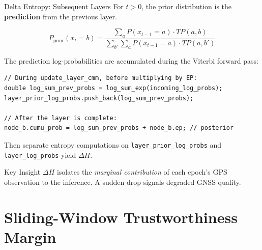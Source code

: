 \documentclass[10pt,aspectratio=169]{beamer}
\begin{document}
\begin{frame}{Delta Entropy: Subsequent Layers}
  For $t > 0$, the prior distribution is the \textbf{prediction} from the
  previous layer.

  \vspace{0.3cm}
  \begin{equation*}
    P_{\text{prior}}(x_t = b) = \frac{\sum_a P(x_{t-1}=a) \cdot TP(a,b)}
                                      {\sum_{b'} \sum_a P(x_{t-1}=a) \cdot TP(a,b')}
  \end{equation*}

  \vspace{0.3cm}
  The prediction log-probabilities are accumulated during the Viterbi
  forward pass:

  \begin{lstlisting}[basicstyle=\ttfamily\scriptsize]
// During update_layer_cmm, before multiplying by EP:
double log_sum_prev_probs = log_sum_exp(incoming_log_probs);
layer_prior_log_probs.push_back(log_sum_prev_probs);

// After the layer is complete:
node_b.cumu_prob = log_sum_prev_probs + node_b.ep; // posterior
  \end{lstlisting}

  \vspace{0.3cm}
  Then separate entropy computations on \texttt{layer\_prior\_log\_probs} and
  \texttt{layer\_log\_probs} yield $\Delta H$.

  \begin{block}{Key Insight}
    $\Delta H$ isolates the \emph{marginal contribution} of each epoch's GPS
    observation to the inference. A sudden drop signals degraded GNSS quality.
  \end{block}
\end{frame}

\section{Sliding-Window Trustworthiness Margin}
\end{document}
